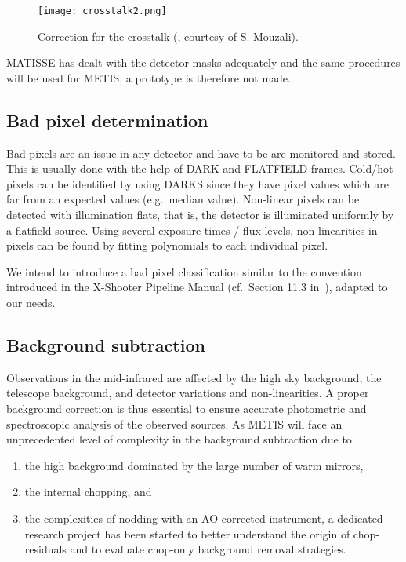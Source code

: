 \begin{figure}[ht]
  \centering
  \texttt{[image: crosstalk2.png]}
  \caption[Detector crosstalk correction]{Correction for the crosstalk
    (\cite{matisse_minutes}, courtesy of S. Mouzali).}
  \label{fig:crosstalk2}
\end{figure}

MATISSE has dealt with the detector masks adequately and the same procedures will be used for METIS; a prototype is therefore not made.


\subsection{Bad pixel determination}\label{ssec:criticalbadpixeldetermination}

Bad pixels are an issue in any detector and have to be are monitored and stored.
This is usually done with the help of DARK and FLATFIELD frames.
Cold/hot pixels can be identified by using DARKS since they have pixel values which are far from an expected values (e.g.\ median value).
Non-linear pixels can be detected with illumination flats, that is, the detector is illuminated uniformly by a flatfield source.
Using  several exposure times / flux levels, non-linearities in pixels can be found by fitting polynomials to each  individual pixel.

We intend to introduce a bad pixel classification similar to the convention introduced in the X-Shooter Pipeline Manual (cf.\ Section 11.3 in~\cite{xshooter_manual}), adapted to our needs.


\subsection{Background subtraction}\label{ssec:criticalbackgroundsubtraction}
Observations in the mid-infrared are affected by the high sky background, the telescope background, and detector variations and non-linearities.
A proper background correction is thus essential to ensure accurate photometric and spectroscopic analysis of the observed sources.
As METIS will face an unprecedented level of complexity in the background subtraction due to
\begin{enumerate}
    \item the high background dominated by the large number of warm mirrors,
    \item the internal chopping, and
    \item the complexities of nodding with an AO-corrected instrument,
        a dedicated research project has been started to better understand
        the origin of chop-residuals and to evaluate chop-only background removal strategies.
\end{enumerate}

